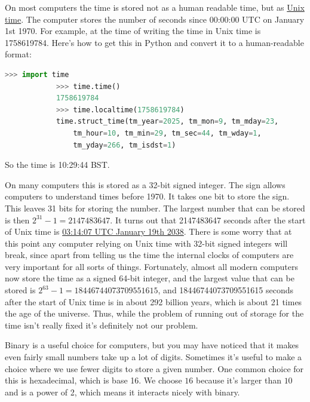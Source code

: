 \documentclass[fleqn]{LectureClass/LectureClass}
\begin{document}
    \begin{remark}{}{}
        On most computers the time is stored not as a human readable time, but as \href{https://en.wikipedia.org/wiki/Unix_time}{Unix time}.
        The computer stores the number of seconds since 00:00:00 UTC on January 1st 1970.
        For example, at the time of writing the time in Unix time is 1758619784.
        Here's how to get this in Python and convert it to a human-readable format:
        \begin{lstlisting}[gobble=12, language=python, basicstyle=\color{black!85}\ttfamily]
            >>> import time
            >>> time.time()
            1758619784
            >>> time.localtime(1758619784)
            time.struct_time(tm_year=2025, tm_mon=9, tm_mday=23,
                tm_hour=10, tm_min=29, tm_sec=44, tm_wday=1,
                tm_yday=266, tm_isdst=1)
        \end{lstlisting}
        So the time is 10:29:44 BST.
        
        On many computers this is stored as a 32-bit signed integer.
        The sign allows computers to understand times before 1970.
        It takes one bit to store the sign.
        This leaves 31 bits for storing the number.
        The largest number that can be stored is then \(2^{31} - 1 = \num{2147483647}\).
        It turns out that \num{2147483647} seconds after the start of Unix time is \href{https://en.wikipedia.org/wiki/Year_2038_problem}{03:14:07 UTC January 19th 2038}.
        There is some worry that at this point any computer relying on Unix time with 32-bit signed integers will break, since apart from telling us the time the internal clocks of computers are very important for all sorts of things.
        Fortunately, almost all modern computers now store the time as a signed 64-bit integer, and the largest value that can be stored is \(2^{63} - 1 = \num{18446744073709551615}\), and \num{18446744073709551615} seconds after the start of Unix time is in about 292 billion years, which is about 21 times the age of the universe.
        Thus, while the problem of running out of storage for the time isn't really fixed it's definitely not our problem.
    \end{remark}
    
    Binary is a useful choice for computers, but you may have noticed that it makes even fairly small numbers take up a lot of digits.
    Sometimes it's useful to make a choice where we use fewer digits to store a given number.
    One common choice for this is hexadecimal, which is base 16.
    We choose \(16\) because it's larger than \(10\) and is a power of 2, which means it interacts nicely with binary.
    
\end{document}
